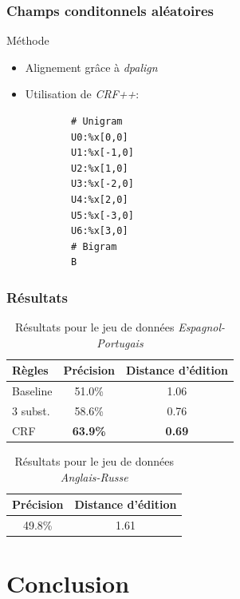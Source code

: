 \documentclass{beamer}
\begin{document}
\begin{frame}[fragile]
\frametitle{Champs conditonnels aléatoires}
	\begin{block}{Méthode}
		\begin{itemize}
            \item Alignement grâce à \emph{dpalign}
            \item Utilisation de \emph{CRF++}:
		{\scriptsize \begin{verbatim}
		# Unigram
		U0:%x[0,0]
		U1:%x[-1,0]
		U2:%x[1,0]
		U3:%x[-2,0]
		U4:%x[2,0]
		U5:%x[-3,0]
		U6:%x[3,0]
		# Bigram
		B
		\end{verbatim}}
		\end{itemize}
	\end{block}
\end{frame}

\begin{frame}
\frametitle{Résultats}
\begin{table}[H]
\caption{Résultats pour le jeu de données \emph{Espagnol-Portugais} }
\begin{tabular}{|l|c|c|}
\hline
Règles&Précision&Distance d'édition\\
\hline
Baseline&51.0\%&1.06\\
\hline
3 subst.&58.6\%&0.76\\
\hline
CRF&\textbf{63.9\%}&\textbf{0.69}\\
\hline
\end{tabular}
\end{table}

\begin{table}[H]
\caption{Résultats pour le jeu de données \emph{Anglais-Russe} }
\begin{center}
\begin{tabular}{|c|c|}
\hline
Précision&Distance d'édition\\
\hline
49.8\%&1.61\\
\hline
\end{tabular}
\end{center}
\end{table}

\end{frame}

\section{Conclusion}
\begin{frame}
\end{frame}
\end{document}
